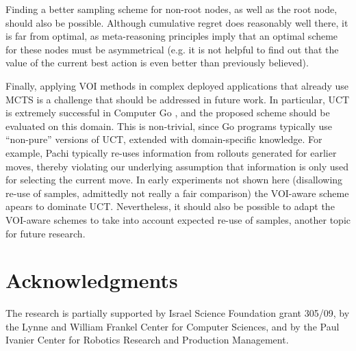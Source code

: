 \documentclass[letterpaper]{article}
\begin{document}
Finding a better sampling scheme for non-root nodes,
as well as the root node, should also be possible.
Although cumulative regret does reasonably
well there, it is far from optimal, as meta-reasoning principles imply that an optimal scheme
for these nodes must be asymmetrical (e.g. it is not helpful to find out that the
value of the current best action is even better than previously believed).

Finally, applying VOI methods in complex deployed applications that already use
MCTS is a challenge that should be addressed in future work.
In particular, UCT is extremely successful in Computer
Go \cite{GellyWang.mogo,Braudis.pachi,Enzenberger.Fuego},
and the proposed scheme should be evaluated on this domain. This is non-trivial, since
Go programs typically use ``non-pure'' versions of UCT, extended with
domain-specific knowledge. For example, Pachi \cite{Braudis.pachi}
typically re-uses information from rollouts generated for earlier
moves, thereby violating our underlying assumption that information is
only used for selecting the current move.  In early experiments not
shown here (disallowing re-use of samples, admittedly not really a
fair comparison) the VOI-aware scheme apears to dominate UCT.
Nevertheless, it should also be possible to adapt the VOI-aware
schemes to take into account expected re-use of samples, another topic
for future research.


\section*{Acknowledgments}

The research is partially supported by Israel
Science Foundation grant 305/09, by the Lynne and William Frankel
Center for Computer Sciences, and by the Paul Ivanier Center for
Robotics Research and Production Management.



\end{document}
